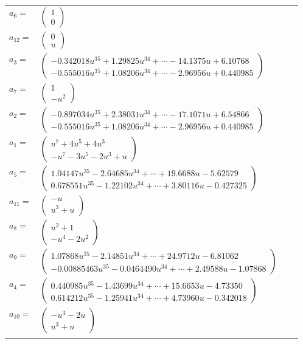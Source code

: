 \documentclass[1p]{elsarticle_modified}
\theoremstyle{definition}
\begin{document}
\begin{tabular}{m{7pt} m{180pt} m{7pt} m{180pt} }
\flushright $a_{6}=$&$\begin{pmatrix}1\\0\end{pmatrix}$ \\
\flushright $a_{12}=$&$\begin{pmatrix}0\\u\end{pmatrix}$ \\
\flushright $a_{3}=$&$\begin{pmatrix}-0.342018 u^{35}+1.29825 u^{34}+\cdots-14.1375 u+6.10768\\-0.555016 u^{35}+1.08206 u^{34}+\cdots-2.96956 u+0.440985\end{pmatrix}$ \\
\flushright $a_{7}=$&$\begin{pmatrix}1\\- u^2\end{pmatrix}$ \\
\flushright $a_{2}=$&$\begin{pmatrix}-0.897034 u^{35}+2.38031 u^{34}+\cdots-17.1071 u+6.54866\\-0.555016 u^{35}+1.08206 u^{34}+\cdots-2.96956 u+0.440985\end{pmatrix}$ \\
\flushright $a_{1}=$&$\begin{pmatrix}u^7+4 u^5+4 u^3\\- u^7-3 u^5-2 u^3+u\end{pmatrix}$ \\
\flushright $a_{5}=$&$\begin{pmatrix}1.04147 u^{35}-2.64685 u^{34}+\cdots+19.6688 u-5.62579\\0.678551 u^{35}-1.22102 u^{34}+\cdots+3.80116 u-0.427325\end{pmatrix}$ \\
\flushright $a_{11}=$&$\begin{pmatrix}- u\\u^3+u\end{pmatrix}$ \\
\flushright $a_{8}=$&$\begin{pmatrix}u^2+1\\- u^4-2 u^2\end{pmatrix}$ \\
\flushright $a_{9}=$&$\begin{pmatrix}1.07868 u^{35}-2.14851 u^{34}+\cdots+24.9712 u-6.81062\\-0.00885463 u^{35}-0.0464490 u^{34}+\cdots+2.49588 u-1.07868\end{pmatrix}$ \\
\flushright $a_{4}=$&$\begin{pmatrix}0.440985 u^{35}-1.43699 u^{34}+\cdots+15.6653 u-4.73350\\0.614212 u^{35}-1.25941 u^{34}+\cdots+4.73960 u-0.342018\end{pmatrix}$ \\
\flushright $a_{10}=$&$\begin{pmatrix}- u^3-2 u\\u^3+u\end{pmatrix}$\\&\end{tabular}
\end{document}
